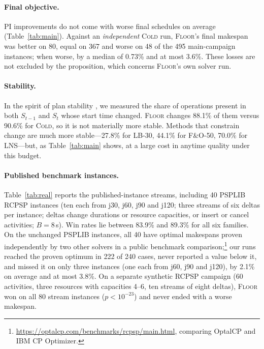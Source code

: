 \documentclass[letterpaper]{article} %
\newcommand{\mcold}{\textsc{Cold}}
\newcommand{\mfloor}{\textsc{Floor}}
\newcommand{\mlns}{\textsc{LNS}}
\newcommand{\mfo}{\textsc{F\&O-50}}
\newcommand{\mlb}{\textsc{LB-30}}
\begin{document}
\paragraph{Final objective.} PI improvements do not come with worse final schedules on average (Table~\ref{tab:main}). Against an \emph{independent} \mcold{} run, \mfloor{}'s final makespan was better on 80, equal on 367 and worse on 48 of the 495 main-campaign instances; when worse, by a median of 0.73\% and at most 3.6\%. These losses are not excluded by the proposition, which concerns \mfloor's own solver run.

\paragraph{Stability.} In the spirit of plan stability \citep{fox2006}, we measured the share of operations present in both $S_{t-1}$ and $S_t$ whose start time changed. \mfloor{} changes 88.1\% of them versus 90.6\% for \mcold{}, so it is not materially more stable. Methods that constrain change are much more stable---27.8\% for \mlb, 44.1\% for \mfo, 70.0\% for \mlns---but, as Table~\ref{tab:main} shows, at a large cost in anytime quality under this budget.

\paragraph{Published benchmark instances.} Table~\ref{tab:real} reports the published-instance streams, including 40 PSPLIB RCPSP instances \citep{kolisch1997} (ten each from j30, j60, j90 and j120; three streams of six deltas per instance; deltas change durations or resource capacities, or insert or cancel activities; $B=8$\,s). Win rates lie between 83.9\% and 89.3\% for all six families. On the unchanged PSPLIB instances, all 40 have optimal makespans proven independently by two other solvers in a public benchmark comparison;\footnote{\url{https://optalcp.com/benchmarks/rcpsp/main.html}, comparing OptalCP and IBM CP Optimizer.} our runs reached the proven optimum in 222 of 240 cases, never reported a value below it, and missed it on only three instances (one each from j60, j90 and j120), by 2.1\% on average and at most 3.8\%. On a separate synthetic RCPSP campaign (60 activities, three resources with capacities 4--6, ten streams of eight deltas), \mfloor{} won on all 80 stream instances ($p < 10^{-23}$) and never ended with a worse makespan.
\end{document}
